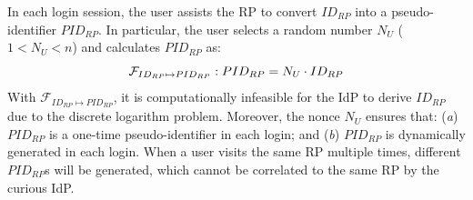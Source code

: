  In each login session, the user assists the RP to convert $ID_{RP}$ into a pseudo-identifier $PID_{RP}$. In particular, the user selects a random number $N_{U}$ ($1 < N_{U}<n$) and calculates $PID_{RP}$ as:
\begin{equation}
\setlength{\abovedisplayskip}{3pt}
\setlength{\belowdisplayskip}{3pt}
\mathcal{F}_{ID_{RP} \mapsto PID_{RP}}: PID_{RP} = {N_{U}} \cdot {ID_{RP}}
\label{equ:PIDRP}
\end{equation}
With $\mathcal{F}_{ID_{RP} \mapsto PID_{RP}}$,  %
it is computationally infeasible for the IdP to derive $ID_{RP}$ %
due to the discrete logarithm problem.
Moreover, the nonce $N_{U}$ ensures that: (\emph{a}) $PID_{RP}$ is a one-time pseudo-identifier in each login;
and (\emph{b}) $PID_{RP}$ is dynamically generated in each login.
When a user visits the same RP multiple times, different $PID_{RP}$s will be generated, which cannot be correlated to the same RP by the curious IdP.




